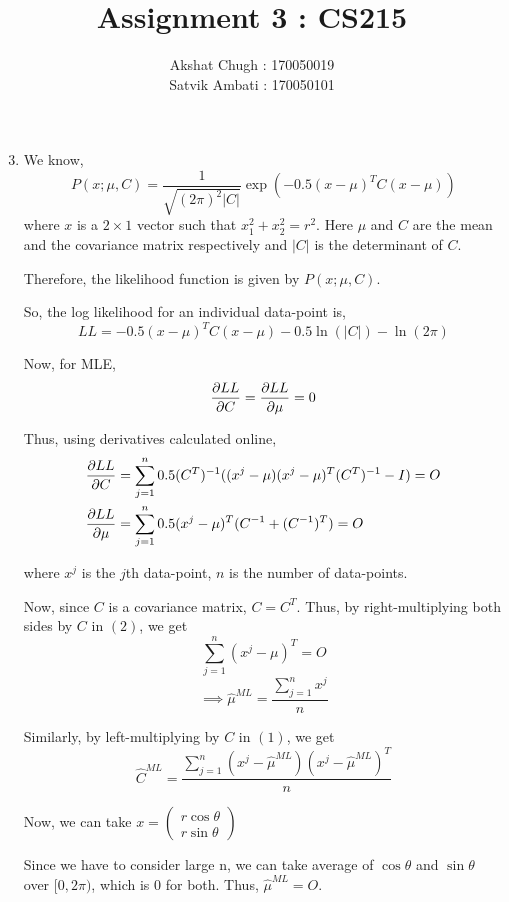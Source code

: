 \documentclass[12pt]{article}
\title{Assignment 3 : CS215}
\author{Akshat Chugh : 170050019 \\ Satvik Ambati : 170050101}
\begin{document}
\maketitle
\begin{enumerate}
	\setcounter{enumi}{2}
	\item 
	We know,
	$$P(x;\mu,C) = \frac{1}{\sqrt{(2\pi)^2 \left|C\right|}} \exp(-0.5(x-\mu)^T C(x-\mu))$$
	where $x$ is a $2 \times 1$ vector such that $x_{1}^2 + x_{2}^2 = r^2$. 
	Here $\mu$ and $C$ are the mean and the covariance matrix respectively and $\left|C\right|$ is the determinant of $C$.
	
	Therefore, the likelihood function is given by $P(x;\mu,C)$.
	
	So, the log likelihood for an individual data-point is, 
	$$LL = -0.5(x-\mu)^T C(x-\mu) - 0.5 \ln(\left|C\right|) - \ln(2\pi)$$
	
	Now, for MLE, 
	$$\pdv{LL}{C}= \pdv{LL}{\mu}=0 $$
	
	Thus, using derivatives calculated online,
	\begin{align}
		\pdv{LL}{C} &= \sum_{j=1}^n 0.5 (C^T)^{-1}((x^j-\mu)(x^j-\mu)^T(C^T)^{-1} - I) = O \\
		\pdv{LL}{\mu} &= \sum_{j=1}^n 0.5(x^j-\mu)^T (C^{-1}+(C^{-1})^T) = O 
	\end{align} 
	
	where $x^j$ is the $j$th data-point, $n$ is the number of data-points.
	
	Now, since $C$ is a covariance matrix, $C=C^T$. Thus, by right-multiplying both sides by $C$ in $(2)$, we get 
	$$\sum_{j=1}^n (x^j-\mu)^T = O$$
	\begin{equation}
		\implies \hat{\mu}^{ML} = \frac{\sum_{j=1}^n x^j}{n}
	\end{equation}
	
	Similarly, by left-multiplying by $C$ in $(1)$, we get 
	\begin{equation}
		\hat{C}^{ML} = \frac{\sum_{j=1}^n (x^j-\hat{\mu}^{ML})(x^j-\hat{\mu}^{ML})^T}{n}
	\end{equation}
	
	Now, we can take $x = \begin{pmatrix}
	r \cos\theta \\
	r \sin\theta
	\end{pmatrix}$
	
	Since we have to consider large n, we can take average of $\cos\theta$ and $\sin\theta$ over $[0,2\pi)$, which is $0$ for both. Thus, $\hat{\mu}^{ML} = O$.
	

\end{enumerate}
\end{document}

